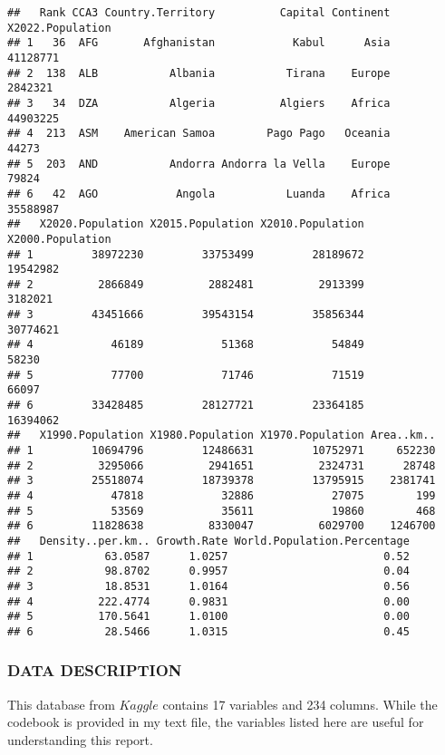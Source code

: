 \documentclass[
]{article}
\begin{document}
\begin{verbatim}
##   Rank CCA3 Country.Territory          Capital Continent X2022.Population
## 1   36  AFG       Afghanistan            Kabul      Asia         41128771
## 2  138  ALB           Albania           Tirana    Europe          2842321
## 3   34  DZA           Algeria          Algiers    Africa         44903225
## 4  213  ASM    American Samoa        Pago Pago   Oceania            44273
## 5  203  AND           Andorra Andorra la Vella    Europe            79824
## 6   42  AGO            Angola           Luanda    Africa         35588987
##   X2020.Population X2015.Population X2010.Population X2000.Population
## 1         38972230         33753499         28189672         19542982
## 2          2866849          2882481          2913399          3182021
## 3         43451666         39543154         35856344         30774621
## 4            46189            51368            54849            58230
## 5            77700            71746            71519            66097
## 6         33428485         28127721         23364185         16394062
##   X1990.Population X1980.Population X1970.Population Area..km..
## 1         10694796         12486631         10752971     652230
## 2          3295066          2941651          2324731      28748
## 3         25518074         18739378         13795915    2381741
## 4            47818            32886            27075        199
## 5            53569            35611            19860        468
## 6         11828638          8330047          6029700    1246700
##   Density..per.km.. Growth.Rate World.Population.Percentage
## 1           63.0587      1.0257                        0.52
## 2           98.8702      0.9957                        0.04
## 3           18.8531      1.0164                        0.56
## 4          222.4774      0.9831                        0.00
## 5          170.5641      1.0100                        0.00
## 6           28.5466      1.0315                        0.45
\end{verbatim}

\hypertarget{data-description}{%
\subsubsection{DATA DESCRIPTION}\label{data-description}}

This database from \(Kaggle\) contains 17 variables and 234 columns.
While the codebook is provided in my text file, the variables listed
here are useful for understanding this report.
\end{document}
